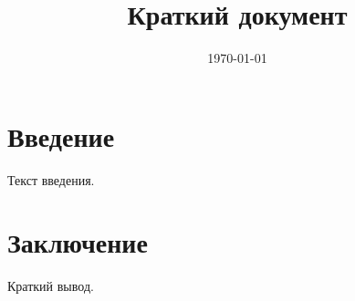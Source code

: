 \documentclass[a4paper,12pt]{article}
\title{Краткий документ}
\author{}
\date{\today}
\begin{document}
\maketitle
\section{Введение}
Текст введения.
\section{Заключение}
Краткий вывод.
\end{document}
